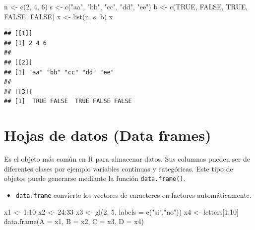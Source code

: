 \documentclass[
]{book}
\newenvironment{Shaded}{\begin{snugshade}}{\end{snugshade}}
\newcommand{\AttributeTok}[1]{\textcolor[rgb]{0.77,0.63,0.00}{#1}}
\newcommand{\ConstantTok}[1]{\textcolor[rgb]{0.00,0.00,0.00}{#1}}
\newcommand{\DecValTok}[1]{\textcolor[rgb]{0.00,0.00,0.81}{#1}}
\newcommand{\FunctionTok}[1]{\textcolor[rgb]{0.00,0.00,0.00}{#1}}
\newcommand{\NormalTok}[1]{#1}
\newcommand{\OtherTok}[1]{\textcolor[rgb]{0.56,0.35,0.01}{#1}}
\newcommand{\SpecialCharTok}[1]{\textcolor[rgb]{0.00,0.00,0.00}{#1}}
\newcommand{\StringTok}[1]{\textcolor[rgb]{0.31,0.60,0.02}{#1}}
\newenvironment{rmdblock}[1]
{\begin{shaded*}
		\begin{itemize}
			\renewcommand{\labelitemi}{
				\raisebox{-.7\height}[0pt][0pt]{
					{\setkeys{Gin}{width=3em,keepaspectratio}\texttt{[image: images/\#1]}}
				}
			}
			\item
		}
		{
		\end{itemize}
	\end{shaded*}
}
\newenvironment{rmdnote}
{\begin{rmdblock}{note}}
	{\end{rmdblock}}
\begin{document}
\begin{Shaded}
\begin{Highlighting}[]
\NormalTok{n }\OtherTok{\textless{}{-}}  \FunctionTok{c}\NormalTok{(}\DecValTok{2}\NormalTok{, }\DecValTok{4}\NormalTok{, }\DecValTok{6}\NormalTok{)}
\NormalTok{s }\OtherTok{\textless{}{-}}  \FunctionTok{c}\NormalTok{(}\StringTok{"aa"}\NormalTok{, }\StringTok{"bb"}\NormalTok{, }\StringTok{"cc"}\NormalTok{, }\StringTok{"dd"}\NormalTok{, }\StringTok{"ee"}\NormalTok{)}
\NormalTok{b }\OtherTok{\textless{}{-}}  \FunctionTok{c}\NormalTok{(}\ConstantTok{TRUE}\NormalTok{, }\ConstantTok{FALSE}\NormalTok{, }\ConstantTok{TRUE}\NormalTok{, }\ConstantTok{FALSE}\NormalTok{, }\ConstantTok{FALSE}\NormalTok{)}
\NormalTok{x }\OtherTok{\textless{}{-}}  \FunctionTok{list}\NormalTok{(n, s, b)}
\NormalTok{x}
\end{Highlighting}
\end{Shaded}

\begin{verbatim}
## [[1]]
## [1] 2 4 6
## 
## [[2]]
## [1] "aa" "bb" "cc" "dd" "ee"
## 
## [[3]]
## [1]  TRUE FALSE  TRUE FALSE FALSE
\end{verbatim}

\hypertarget{hojas-de-datos-data-frames}{%
\section{Hojas de datos (Data frames)}\label{hojas-de-datos-data-frames}}

Es el objeto más común en R para almacenar datos. Sus columnas pueden ser de diferentes clases por ejemplo variables continuas y categóricas. Este tipo de objetos puede generarse mediante la función \texttt{data.frame()}.

\begin{rmdnote}
\texttt{data.frame} convierte los vectores de caracteres en factores
automáticamente.
\end{rmdnote}

\begin{Shaded}
\begin{Highlighting}[]
\NormalTok{x1 }\OtherTok{\textless{}{-}} \DecValTok{1}\SpecialCharTok{:}\DecValTok{10}
\NormalTok{x2 }\OtherTok{\textless{}{-}} \DecValTok{24}\SpecialCharTok{:}\DecValTok{33}
\NormalTok{x3 }\OtherTok{\textless{}{-}} \FunctionTok{gl}\NormalTok{(}\DecValTok{2}\NormalTok{, }\DecValTok{5}\NormalTok{, }\AttributeTok{labels =} \FunctionTok{c}\NormalTok{(}\StringTok{"si"}\NormalTok{,}\StringTok{"no"}\NormalTok{))}
\NormalTok{x4 }\OtherTok{\textless{}{-}}\NormalTok{ letters[}\DecValTok{1}\SpecialCharTok{:}\DecValTok{10}\NormalTok{]}
\FunctionTok{data.frame}\NormalTok{(}\AttributeTok{A =}\NormalTok{ x1, }\AttributeTok{B =}\NormalTok{ x2, }\AttributeTok{C =}\NormalTok{ x3, }\AttributeTok{D =}\NormalTok{ x4)}
\end{Highlighting}
\end{Shaded}
\end{document}
